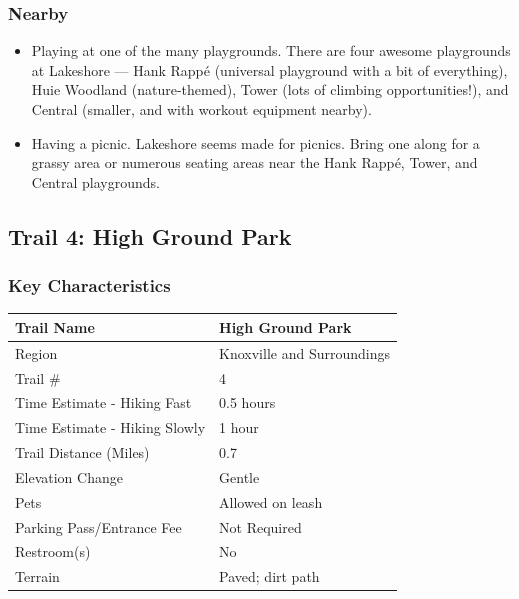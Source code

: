 \documentclass[
  letterpaper,
  DIV=11,
  numbers=noendperiod]{scrartcl}
\providecommand{\tightlist}{%
  \setlength{\itemsep}{0pt}\setlength{\parskip}{0pt}}\usepackage{longtable,booktabs,array}
\begin{document}
\hypertarget{nearby-2}{%
\subsubsection{Nearby}\label{nearby-2}}

\begin{itemize}
\tightlist
\item
  Playing at one of the many playgrounds. There are four awesome
  playgrounds at Lakeshore --- Hank Rappé (universal playground with a
  bit of everything), Huie Woodland (nature-themed), Tower (lots of
  climbing opportunities!), and Central (smaller, and with workout
  equipment nearby).
\item
  Having a picnic. Lakeshore seems made for picnics. Bring one along for
  a grassy area or numerous seating areas near the Hank Rappé, Tower,
  and Central playgrounds.
\end{itemize}

\hypertarget{trail-4-high-ground-park}{%
\subsection{Trail 4: High Ground Park}\label{trail-4-high-ground-park}}

\hypertarget{key-characteristics-3}{%
\subsubsection{Key Characteristics}\label{key-characteristics-3}}

\begin{longtable}[]{@{}ll@{}}
\toprule\noalign{}
Trail Name & High Ground Park \\
\midrule\noalign{}
\endhead
\bottomrule\noalign{}
\endlastfoot
Region & Knoxville and Surroundings \\
Trail \# & 4 \\
Time Estimate - Hiking Fast & 0.5 hours \\
Time Estimate - Hiking Slowly & 1 hour \\
Trail Distance (Miles) & 0.7 \\
Elevation Change & Gentle \\
Pets & Allowed on leash \\
Parking Pass/Entrance Fee & Not Required \\
Restroom(s) & No \\
Terrain & Paved; dirt path \\
\end{longtable}
\end{document}
